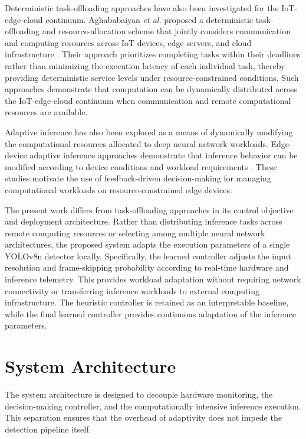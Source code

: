 \documentclass{ieeeaccess}
\begin{document}
Deterministic task-offloading approaches have also been investigated for the
IoT-edge-cloud continuum. Aghababaiyan \emph{et al.} proposed a deterministic
task-offloading and resource-allocation scheme that jointly considers
communication and computing resources across IoT devices, edge servers, and
cloud infrastructure \cite{b25}. Their approach prioritizes completing tasks
within their deadlines rather than minimizing the execution latency of each
individual task, thereby providing deterministic service levels under
resource-constrained conditions. Such approaches demonstrate that
computation can be dynamically distributed across the IoT-edge-cloud
continuum when communication and remote computational resources are available.

Adaptive inference has also been explored as a means of dynamically modifying
the computational resources allocated to deep neural network workloads.
Edge-device adaptive inference approaches demonstrate that inference behavior
can be modified according to device conditions and workload requirements
\cite{b18}. These studies motivate the use of feedback-driven decision-making
for managing computational workloads on resource-constrained edge devices.

The present work differs from task-offloading approaches in its control
objective and deployment architecture. Rather than distributing inference
tasks across remote computing resources or selecting among multiple neural
network architectures, the proposed system adapts the execution parameters of
a single YOLOv8n detector locally. Specifically, the learned controller
adjusts the input resolution and frame-skipping probability according to
real-time hardware and inference telemetry. This provides workload adaptation
without requiring network connectivity or transferring inference workloads to
external computing infrastructure. The heuristic controller is retained as an
interpretable baseline, while the final learned controller provides
continuous adaptation of the inference parameters.

\section{System Architecture}
\label{sec:architecture}
The system architecture is designed to decouple hardware monitoring, the decision-making controller, and the computationally intensive inference execution. This separation ensures that the overhead of adaptivity does not impede the detection pipeline itself.
\end{document}

